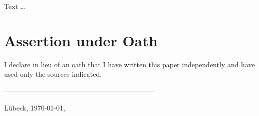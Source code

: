 Text \dots

\clearpage

{}
\chapter*{Assertion under Oath}
I declare in lieu of an oath that I have written this paper independently and have used only the sources indicated.

\begin{comment}
[Nach Ausdruck unterschreiben. Muss auf Papier sein.]
\end{comment}

-----------------------------------------------------------------

Lübeck, \today, \authorMA